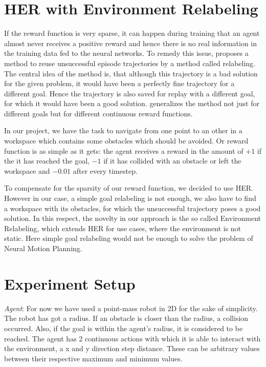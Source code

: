 \documentclass[conference]{IEEEtran}
\begin{document}
\section{HER with Environment Relabeling}

If the reward function is very sparse, it can happen during training that an agent almost never receives a positive reward and hence there is no real information in the training data fed to the neural networks. To remedy this issue, \cite{HER} proposes a method to reuse unsuccessful episode trajectories by a method called relabeling. The central idea of the method is, that although this trajectory is a bad solution for the given problem, it would have been a perfectly fine trajectory for a different goal. Hence the trajectory is also saved for replay with a different goal, for which it would have been a good solution. \cite{GHER} generalizes the method not just for different goals but for different continuous reward functions.

In our project, we have the task to navigate from one point to an other in a workspace which contains some obstacles which should be avoided. Or reward function is as simple as it gets: the agent receives a reward in the amount of $+1$ if the it has reached the goal, $-1$ if it has collided with an obstacle or left the workspace and $-0.01$ after every timestep. 

To compensate for the sparsity of our reward function, we decided to use HER. However in our case, a simple goal relabeling is not enough, we also have to find a workspace with its obstacles, for which the unsuccessful trajectory poses a good solution. In this respect, the novelty in our approach is the so called Environment Relabeling, which extends HER for use cases, where the environment is not static. Here simple goal relabeling would not be enough to solve the problem of Neural Motion Planning.

\section{Experiment Setup}

\textit{Agent}: For now we have used a point-mass robot in 2D for the sake of simplicity. The robot has got a radius. If an obstacle is closer than the radius, a collision occurred. Also, if the goal is within the agent's radius, it is considered to be reached. The agent has 2 continuous actions with which it is able to interact with the environment, a x and y direction step distance. These can be arbitrary values between their respective maximum and minimum values.
\end{document}
